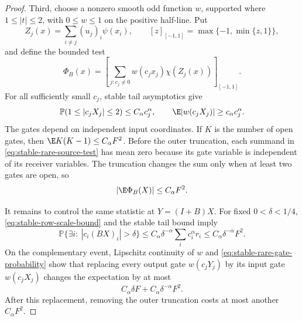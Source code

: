 \begin{proof}
Third, choose a nonzero smooth odd function \(w\), supported where
\(1\le|t|\le2\), with \(0\le w\le1\) on the positive half-line.
Put
\[
 Z_j(x)=\sum_{i\ne j}(u_j)_i\psi(x_i),
 \qquad
 [z]_{[-1,1]}=\max\{-1,\min\{z,1\}\},
\]
and define the bounded test
\begin{equation}
 \Phi_B(x)=
 \left[\sum_{j:c_j\ne0}w(c_jx_j)\chi(Z_j(x))\right]_{[-1,1]}.
 \label{eq:stable-rare-source-test}
\end{equation}
For all sufficiently small \(c_j\), stable tail asymptotics give
\begin{equation}
 \mathbb P(1\le|c_jX_j|\le2)\le C_\alpha c_j^\alpha,
 \qquad
 \E|w(c_jX_j)|\ge c_\alpha c_j^\alpha.
 \label{eq:stable-rare-gate-probability}
\end{equation}
The gates depend on independent input coordinates.
If \(K\) is the number of open gates, then
\(\E K(K-1)\le C_\alpha F^2\).
Before the outer truncation, each summand in
\eqref{eq:stable-rare-source-test} has mean zero because its gate variable
is independent of its receiver variables.
The truncation changes the sum only when at least two gates are open, so
\begin{equation}
 |\E\Phi_B(X)|\le C_\alpha F^2.
 \label{eq:stable-rare-source-input-mean}
\end{equation}

It remains to control the same statistic at \(Y=(I+B)X\).
For fixed \(0<\delta<1/4\),
\eqref{eq:stable-row-scale-bound} and the stable tail bound imply
\begin{equation}
 \mathbb P\{\exists i:\ |c_i(BX)_i|>\delta\}
 \le C_\alpha\delta^{-\alpha}\sum_i c_i^\alpha r_i
 \le C_\alpha\delta^{-\alpha}F^2.
 \label{eq:stable-output-gate-exception}
\end{equation}
On the complementary event, Lipschitz continuity of \(w\) and
\eqref{eq:stable-rare-gate-probability} show that replacing every output
gate \(w(c_jY_j)\) by its input gate \(w(c_jX_j)\) changes the expectation
by at most
\begin{equation}
 C_\alpha\delta F+C_\alpha\delta^{-\alpha}F^2.
 \label{eq:stable-output-gate-error}
\end{equation}
After this replacement, removing the outer truncation costs at most another
\(C_\alpha F^2\).


\end{proof}
